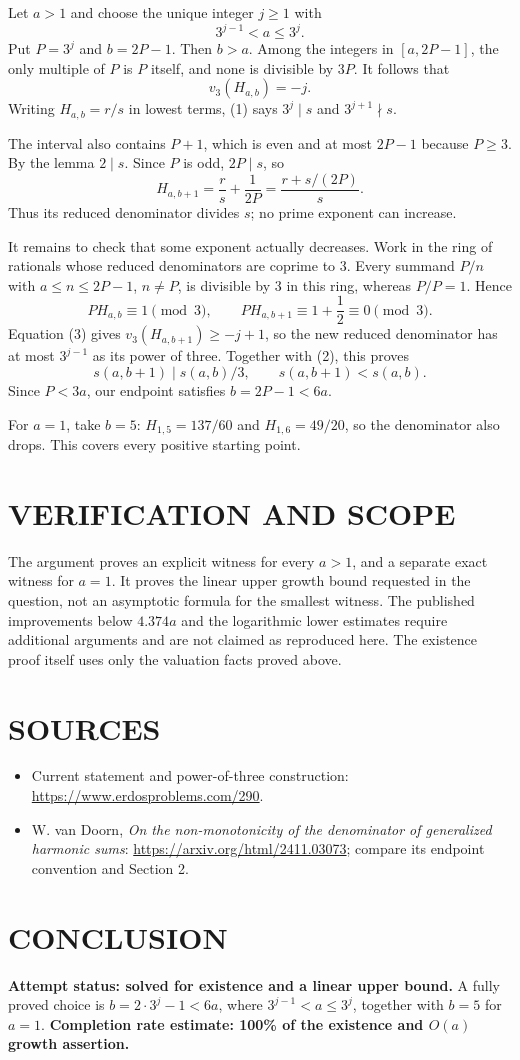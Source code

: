 Let $a>1$ and choose the unique integer $j\geq1$ with
\[
3^{j-1}<a\leq3^j.
\]
Put $P=3^j$ and $b=2P-1$. Then $b>a$. Among the integers in $[a,2P-1]$, the only multiple of $P$ is $P$ itself, and none is divisible by $3P$. It follows that
\[
v_3(H_{a,b})=-j.
\tag{1}
\]
Writing $H_{a,b}=r/s$ in lowest terms, (1) says $3^j\mid s$ and $3^{j+1}\nmid s$.

The interval also contains $P+1$, which is even and at most $2P-1$ because $P\geq3$. By the lemma $2\mid s$. Since $P$ is odd, $2P\mid s$, so
\[
H_{a,b+1}=\frac rs+\frac1{2P}
=\frac{r+s/(2P)}s.
\tag{2}
\]
Thus its reduced denominator divides $s$; no prime exponent can increase.

It remains to check that some exponent actually decreases. Work in the ring of rationals whose reduced denominators are coprime to $3$. Every summand $P/n$ with $a\leq n\leq2P-1$, $n\neq P$, is divisible by $3$ in this ring, whereas $P/P=1$. Hence
\[
P H_{a,b}\equiv1\pmod3,\qquad
P H_{a,b+1}\equiv1+\frac12\equiv0\pmod3.
\tag{3}
\]
Equation (3) gives $v_3(H_{a,b+1})\geq-j+1$, so the new reduced denominator has at most $3^{j-1}$ as its power of three. Together with (2), this proves
\[
s(a,b+1)\mid s(a,b)/3,
\qquad s(a,b+1)<s(a,b).
\tag{4}
\]
Since $P<3a$, our endpoint satisfies $b=2P-1<6a$.

For $a=1$, take $b=5$: $H_{1,5}=137/60$ and $H_{1,6}=49/20$, so the denominator also drops. This covers every positive starting point.

\section{VERIFICATION AND SCOPE}
The argument proves an explicit witness for every $a>1$, and a separate exact witness for $a=1$. It proves the linear upper growth bound requested in the question, not an asymptotic formula for the smallest witness. The published improvements below $4.374a$ and the logarithmic lower estimates require additional arguments and are not claimed as reproduced here. The existence proof itself uses only the valuation facts proved above.

\section{SOURCES}
\begin{itemize}
\item Current statement and power-of-three construction: \url{https://www.erdosproblems.com/290}.
\item W. van Doorn, \emph{On the non-monotonicity of the denominator of generalized harmonic sums}: \url{https://arxiv.org/html/2411.03073}; compare its endpoint convention and Section 2.
\end{itemize}
\section{CONCLUSION}
\textbf{Attempt status: solved for existence and a linear upper bound.}
A fully proved choice is $b=2\cdot3^j-1<6a$, where $3^{j-1}<a\leq3^j$, together with $b=5$ for $a=1$.
\textbf{Completion rate estimate: 100\% of the existence and $O(a)$ growth assertion.}
